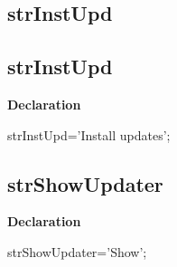 \documentclass{report}
\newif\ifpdf
\begin{document}
\subsection*{\large{\textbf{strInstUpd}}\normalsize\hspace{1ex}\hrulefill}
\else
\subsection*{strInstUpd}
\fi
\label{trstrings-strInstUpd}
\begin{list}{}{
\setlength{\itemindent}{0cm}
\setlength{\listparindent}{0cm}
\setlength{\leftmargin}{\evensidemargin}
\addtolength{\leftmargin}{\tmplength}
\settowidth{\labelsep}{X}
\addtolength{\leftmargin}{\labelsep}
\setlength{\labelwidth}{\tmplength}
}
\item[\textbf{Declaration}\hfill]
\ifpdf
\begin{flushleft}
\fi
\begin{ttfamily}
strInstUpd='Install updates';\end{ttfamily}

\ifpdf
\end{flushleft}
\fi

\end{list}
\ifpdf
\subsection*{\large{\textbf{strShowUpdater}}\normalsize\hspace{1ex}\hrulefill}
\else
\subsection*{strShowUpdater}
\fi
\label{trstrings-strShowUpdater}
\begin{list}{}{
\setlength{\itemindent}{0cm}
\setlength{\listparindent}{0cm}
\setlength{\leftmargin}{\evensidemargin}
\addtolength{\leftmargin}{\tmplength}
\settowidth{\labelsep}{X}
\addtolength{\leftmargin}{\labelsep}
\setlength{\labelwidth}{\tmplength}
}
\item[\textbf{Declaration}\hfill]
\ifpdf
\begin{flushleft}
\fi
\begin{ttfamily}
strShowUpdater='Show';\end{ttfamily}

\ifpdf
\end{flushleft}
\fi

\end{list}
\ifpdf
\end{document}
